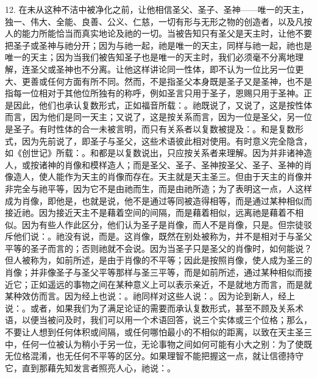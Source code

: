 12. 在未从这种不洁中被净化之前，让他相信圣父、圣子、圣神——唯一的天主，独一、伟大、全能、良善、公义、仁慈，一切有形与无形之物的创造者，以及凡按人的能力所能恰当而真实地论及祂的一切。当被告知只有圣父是天主时，让他不要把圣子或圣神与祂分开；因为与祂一起，祂是唯一的天主，同样与祂一起，祂也是唯一的天主；因为当我们被告知圣子也是唯一的天主时，我们必须毫不分离地理解，连圣父或圣神也不分离。让他这样讲论同一性体，即不认为一位比另一位更大、更善或任何方面有所不同。然而，不是指圣父本身既是圣子又是圣神，也不是指每一位相对于其他位所独有的称呼，例如圣言只用于圣子，恩赐只用于圣神。正是因此，他们也承认复数形式，正如福音所载：。祂既说了，又说了，这是按性体而言，因为他们是同一天主；又说了，这是按关系而言，因为一位是圣父，另一位是圣子。有时性体的合一未被言明，而只有关系者以复数被提及：。和是复数形式，因为先前说了，即圣子与圣父，这些术语彼此相对使用。有时意义完全隐含，如《创世记》所载：。和都是以复数说出，只应按关系者来理解。因为并非诸神造人，或按诸神的肖像和模样造人；而是圣父、圣子、圣神按圣父、圣子、圣神的肖像造人，使人能作为天主的肖像而存在。天主就是天主圣三。但由于天主的肖像并非完全与祂平等，因为它不是由祂而生，而是由祂所造；为了表明这一点，人这样成为肖像，即他是，也就是说，他不是通过等同被造得相等，而是通过某种相似而接近祂。因为接近天主不是藉着空间的间隔，而是藉着相似，远离祂是藉着不相似。因为有些人作此区分，他们认为圣子是肖像，而人不是肖像，只是。但宗徒驳斥他们说：。祂没有说，而是。这肖像，既然在别处被称为，并不是相对于与圣父平等的圣子而言的；否则祂就不会说。因为当圣子只是圣父的肖像时，如何能说？但人被称为，如前所述，是由于肖像的不平等；因此是按照肖像，使人成为圣三的肖像；并非像圣子与圣父平等那样与圣三平等，而是如前所述，通过某种相似而接近它；正如遥远的事物之间在某种意义上可以表示亲近，不是就地方而言，而是就某种效仿而言。因为经上也说：。祂同样对这些人说：。因为论到新人，经上说：。或者，如果我们为了满足论证的需要而承认复数形式，甚至不顾及关系术语，以便当被问及时，我们可以用一个术语回答，说三个实体或三个位格；那么，不要让人想到任何体积或间隔，或任何哪怕最小的不相似的距离，以致在天主圣三中，任何一位被认为稍小于另一位，无论事物之间如何可能有小大之别：为了使既无位格混淆，也无任何不平等的区分。如果理智不能把握这一点，就让信德持守它，直到那藉先知发言者照亮人心，祂说：。\par

